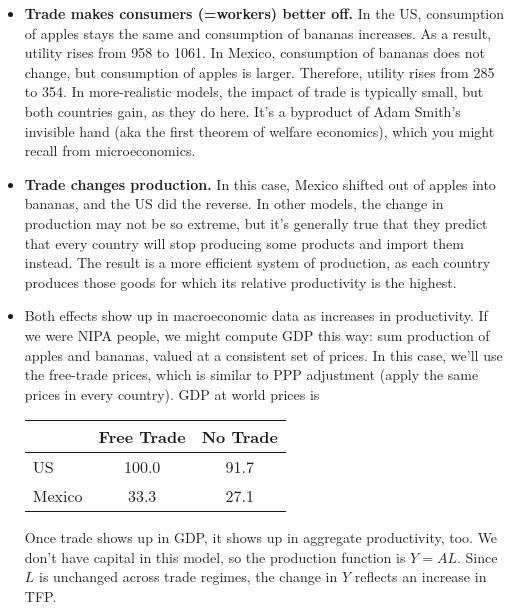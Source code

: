 \begin{itemize}

\item \textbf{Trade makes consumers (=workers) better off.}
In the US, consumption of apples stays the same and consumption of
bananas increases. As a result, utility rises from 958 to 1061. In
Mexico, consumption of bananas does not change, but consumption of
apples is larger. Therefore, utility rises from 285 to 354. In
more-realistic models, the impact of trade is typically small,
but both countries gain, as they do here.
It's a byproduct of Adam Smith's invisible hand (aka the first
theorem of welfare economics), which you might recall from microeconomics. 

\item \textbf{Trade changes production.}  In this
case, Mexico shifted out of apples into bananas, and the US did the reverse.
In other models, the change in production may not be
so extreme, but it's generally true that they predict that every
country will stop producing some products and import them
instead.  The result is a more efficient system of production,
as each country produces those goods for which its relative
productivity is the highest.

\item Both effects show up in macroeconomic data as increases in
productivity.  If we were NIPA people, we might compute GDP this way:  sum production of apples and bananas, valued at a
consistent set of prices.  In this case, we'll use the free-trade
prices, which is similar to PPP adjustment (apply the
same prices in every country).  GDP at world prices is
%
%
\begin{center}
\begin{tabular}{lcc}
\toprule
                    &      Free Trade     &    No Trade    \\%

\midrule%
US                  &         100.0       &      91.7      \\%
%
Mexico              &          33.3       &      27.1      \\%
\bottomrule
\end{tabular}
\end{center}
%
%
Once trade shows up in GDP, it shows up in aggregate
productivity, too.  We don't have capital in this model, so the
production function is $Y = AL$.  Since $L$ is unchanged across
trade regimes, the change in $Y$ reflects an increase in TFP.


\end{itemize}
